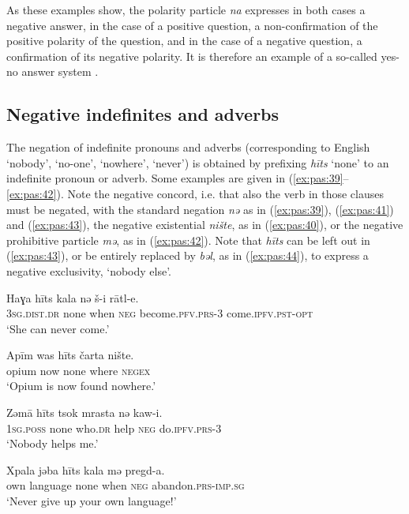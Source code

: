 \documentclass[output=paper,colorlinks,citecolor=brown]{langscibook}
\begin{document}
As these examples show, the polarity particle \textit{na} expresses in both cases a negative answer, in the case of a positive question, a non-confirmation of the positive polarity of the question, and in the case of a negative question, a confirmation of its negative polarity. It is therefore an example of a so-called yes-no answer system \citep[320–321]{KönigSiemund2007}. 

\subsection{Negative indefinites and adverbs}\label{sec:pas:3.2}

The negation of indefinite pronouns and adverbs (corresponding to English ‘nobody’, ‘no-one’, ‘nowhere’, ‘never’) is obtained by prefixing \textit{h\={i}ts} ‘none’ to an indefinite pronoun or adverb. Some examples are given in (\ref{ex:pas:39}--\ref{ex:pas:42}). Note the negative concord, i.e. that also the verb in those clauses must be negated, with the standard negation \textit{nə} as in (\ref{ex:pas:39}), (\ref{ex:pas:41}) and (\ref{ex:pas:43}), the negative existential \textit{nište}, as in (\ref{ex:pas:40}), or the negative prohibitive particle \textit{mə}, as in (\ref{ex:pas:42}). Note that \textit{h\={i}ts} can be left out in (\ref{ex:pas:43}), or be entirely replaced by \textit{bəl}, as in (\ref{ex:pas:44}), to express a negative exclusivity, ‘nobody else’.

\ea\label{ex:pas:39} 
    \gll  Haɣa h\={i}ts kala nə š{}-i r\={a}tl-e. \\ 
         \textsc{3sg.dist.dr} none when \textsc{neg} become.\textsc{pfv.prs{}-3} 
        come.\textsc{ipfv.pst{}-opt} \\
    \glt ‘She can never come.’
\z 

\ea\label{ex:pas:40} 
    \gll  Ap\={i}m was h\={i}ts čarta nište.\\ 
          opium now none where \textsc{negex}\\
    \glt ‘Opium is now found nowhere.’
\z 

\ea\label{ex:pas:41} 
    \gll  Zəmā h\={i}ts tsok mrasta nə kaw{}-i.\\ 
          \textsc{1sg.poss} none who.\textsc{dr} help \textsc{neg} do.\textsc{ipfv.prs-3}\\
    \glt ‘Nobody helps me.’
\z 

\ea\label{ex:pas:42} 
    \gll  Xpala jəba h\={i}ts kala mə pregd-a.\\ 
          own language none when \textsc{neg} abandon.\textsc{prs-imp.sg}\\
    \glt ‘Never give up your own language!’
\z 
\end{document}
